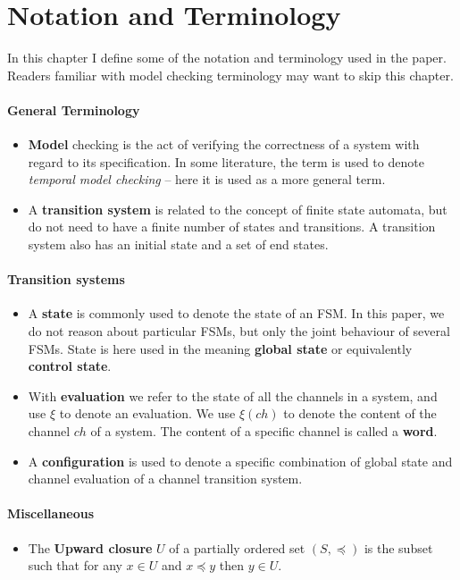 \section{Notation and Terminology}
\label{notation}
In this chapter I define some of the notation and terminology used in the paper. Readers familiar with model checking terminology may want to skip this chapter.

\paragraph{General Terminology}
\begin{itemize}
\item
\textbf{Model} checking is the act of verifying the correctness of a system with regard to its specification. In some literature, the term is used to denote \emph{temporal model checking} -- here it is used as a more general term.

\item
A \textbf{transition system} is related to the concept of finite state automata, but do not need to have a finite number of states and transitions. A transition system also has an initial state and a set of end states.
\end{itemize}


\paragraph{Transition systems}
\begin{itemize}
\item
A \textbf{state} is commonly used to denote the state of an FSM. In this paper, we do not reason about particular FSMs, but only the joint behaviour of several FSMs. State is here used in the meaning \textbf{global state} or equivalently \textbf{control state}.

\item
With \textbf{evaluation} we refer to the state of all the channels in a system, and use $\xi$ to denote an evaluation. We use $\xi(ch)$ to denote the content of the channel $ch$ of a system. The content of a specific channel is called a \textbf{word}.

\item
A \textbf{configuration} is used to denote a specific combination of global state and channel evaluation of a channel transition system. 
\end{itemize}

\paragraph{Miscellaneous}
\begin{itemize}
\item
The \textbf{Upward closure} $U$ of a partially ordered set $(S,\preceq)$ is the subset such that for any $x \in U$ and $x\preceq y$ then $y \in U$.
\end{itemize}